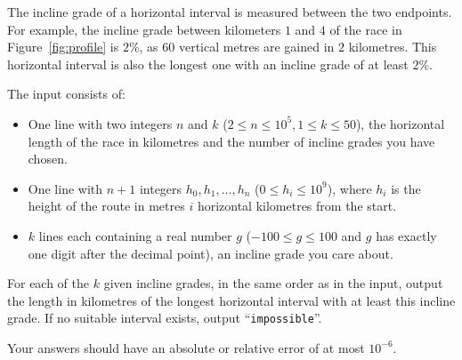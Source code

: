 The incline grade of a horizontal interval is measured between the two endpoints. For example, the
incline grade between kilometers $1$ and $4$ of the race in Figure~\ref{fig:profile} is $2\%$, as
$60$ vertical metres are gained in $2$ kilometres. This horizontal interval is also the longest one
with an incline grade of at least $2\%$.

\vspace{-3mm}
\begin{Input}
  The input consists of:
  \begin{itemize}
    \item One line with two integers $n$ and $k$ ($2\leq n\leq 10^5, 1\leq k\leq 50$), the
      horizontal length of the race in kilometres and the number of incline grades you have chosen.
    \item One line with $n + 1$ integers $h_0, h_1, \ldots, h_n$ ($0\leq h_i\leq 10^9$), where
      $h_i$ is the height of the route in metres $i$ horizontal kilometres from the start.
    \item $k$ lines each containing a real number $g$ ($-100 \le g \le 100$ and $g$ has exactly one digit after the decimal point), an incline grade you care about.
  \end{itemize}
\end{Input}

\begin{Output}
  For each of the $k$ given incline grades, in the same order as in the input, output the length in
  kilometres of the longest horizontal interval with at least this incline grade. If no suitable
  interval exists, output ``\texttt{impossible}''.

  Your answers should have an absolute or relative error of at most $10^{-6}$.
\end{Output}

